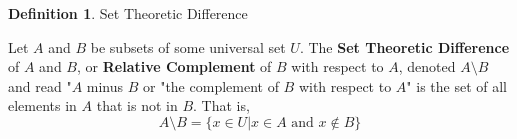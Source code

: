 \documentclass{book}
\theoremstyle{definition}
\newtheorem{definition}{Definition}[section]
\theoremstyle{remark}
\begin{document}
\begin{definition}
Set Theoretic Difference \\
    \begin{tcolorbox}
        Let $A$ and $B$ be subsets of some universal set $U$. The \textbf{Set Theoretic Difference} \footnotemark of $A$ and $B$, or \textbf{Relative Complement} of $B$ with respect to $A$, denoted $A \setminus B$ and read "$A$ minus $B$ or "the complement of $B$ with respect to $A$" is the set of all elements in $A$ that is not in $B$. That is, \\
         \begin{equation*}
                A \setminus B = \{x \in U | x \in A \text{ and } x \notin B \}
            \end{equation*}
    \end{tcolorbox}

\end{definition}
\end{document}
